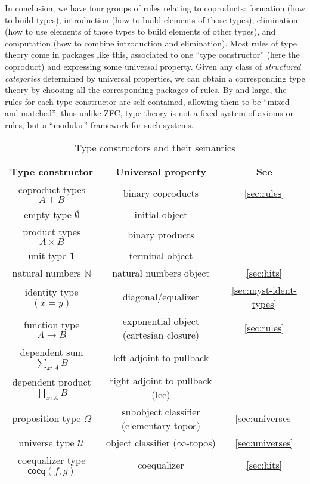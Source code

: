 \documentclass[10pt]{article}
\def\N{\mathbb{N}}
\def\U{\mathscr{U}}
\def\coeq{\mathsf{coeq}}
\def\unit{\mathbf{1}}
\numberwithin{equation}{section}
\begin{document}
In conclusion, we have four groups of rules relating to coproducts: formation (how to build types), introduction (how to build elements of those types), elimination (how to use elements of those types to build elements of other types), and computation (how to combine introduction and elimination).
Most rules of type theory come in packages like this, associated to one ``type constructor'' (here the coproduct) and expressing some universal property.
Given any class of \emph{structured categories} determined by universal properties, we can obtain a corresponding type theory by choosing all the corresponding packages of rules.
By and large, the rules for each type constructor are self-contained, allowing them to be ``mixed and matched''; thus
unlike ZFC, type theory is not a fixed system of axioms or rules, but a ``modular'' framework for such systems.

\begin{table}
  \centering
  \begin{tabular}{c|c|c}
    \textbf{Type constructor} & \textbf{Universal property} & \textbf{See}\\\hline
    coproduct types $A+B$ & binary coproducts & \cref{sec:rules}\\
    empty type $\emptyset$ & initial object\\
    product types $A\times B$ & binary products\\
    unit type $\unit$ & terminal object\\
    natural numbers $\N$ & natural numbers object & \cref{sec:hits} \\
    identity type $(x=y)$ & diagonal/equalizer & \cref{sec:myst-ident-types}\\
    function type $A\to B$ & exponential object (cartesian closure) & \cref{sec:rules}\\
    dependent sum $\sum_{x:A} B$ & left adjoint to pullback\\
    dependent product $\prod_{x:A} B$ & right adjoint to pullback (lcc)\\
    proposition type $\Omega$ & subobject classifier (elementary topos) & \cref{sec:universes}\\
    universe type $\U$ & object classifier ($\infty$-topos) & \cref{sec:universes}\\
    coequalizer type $\coeq(f,g)$ & coequalizer & \cref{sec:hits}\\
  \end{tabular}
  \caption{Type constructors and their semantics}
  \label{tab:type-constructors}
\end{table}
\end{document}
